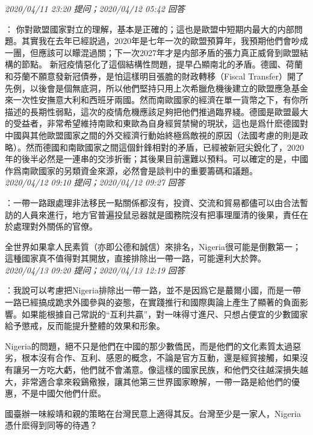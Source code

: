 \documentclass[twocolumn]{ctexart}
\begin{document}
\textit{\hfill\noindent\small 2020/04/11 23:20 提问；2020/04/12 05:42 回答}

：
你對歐盟國家對立的理解，基本是正確的；這也是歐盟中短期内最大的内部問題。其實我在去年已經説過，2020年是七年一次的歐盟預算年，我預期他們會吵成一團，但應該可以矇混過關；下一次2027年才是内部矛盾的張力真正威脅到歐盟結構的節點。
新冠疫情惡化了這個結構性問題，提早凸顯南北的矛盾。德國、荷蘭和芬蘭不願意發新冠債券，是怕這樣明目張膽的財政轉移（Fiscal Transfer）開了先例，以後會是個無底洞，所以他們堅持只用上次希臘危機後建立的歐盟應急基金來一次性安撫意大利和西班牙兩國。然而南歐國家的經濟在單一貨幣之下，有你所描述的長期性弱點，這次的疫情危機應該足夠把他們推過臨界綫。德國是歐盟最大的受益者，非常希望維持南歐和東歐為自身經貿禁臠的現狀，這也是爲什麽德國對中國與其他歐盟國家之間的外交經濟行動始終極爲敵視的原因（法國考慮的則是政略）。然而德國和南歐國家之間這個針鋒相對的矛盾，已經被新冠尖銳化了，2020年的後半必然是一連串的交涉折衝；其後果目前還難以預料。可以確定的是，中國作爲南歐國家的另類資金來源，必然會是談判中的重要籌碼和議題。
\\

\textit{\hfill\noindent\small 2020/04/12 09:10 提问；2020/04/12 09:27 回答}

：一帶一路跟處理非法移民一點關係都沒有，投資、交流和貿易都儘可以由合法暫訪的人員來進行，地方官普遍投鼠忌器就是國務院沒有把事理厘清的後果，責任在於處理對外關係的官僚。

全世界如果拿人民素質（亦即公德和誠信）來排名，Nigeria很可能是倒數第一；這種國家真不值得對其開放，直接排除出一帶一路，可能還利大於弊。
\\

\textit{\hfill\noindent\small 2020/04/13 09:20 提问；2020/04/13 12:19 回答}

：我說可以考慮把Nigeria排除出一帶一路，並不是因爲它是蕞爾小國，而是一帶一路已經搞成跪求外國參與的姿態，在實踐推行和國際輿論上產生了顯著的負面影響。如果能根據自己常説的“互利共贏”，對一味得寸進尺、只想占便宜的少數國家給予懲戒，反而能提升整體的效果和形象。

Nigeria的問題，絕不只是他們在中國的那少數僑民，而是他們的文化素質太過惡劣，根本沒有合作、互利、感恩的概念，不論是官方互動，還是經貿接觸，如果沒有讓另一方吃大虧，他們就不會滿意。像這樣的國家民族，和他們交往越深損失越大，非常適合拿來殺鷄儆猴，讓其他第三世界國家瞭解，一帶一路是給他們的優惠，不是中國欠他們什麽。

國臺辦一味綏靖和親的策略在台灣民意上適得其反。台灣至少是一家人，Nigeria憑什麽得到同等的待遇？
\\
\end{document}
